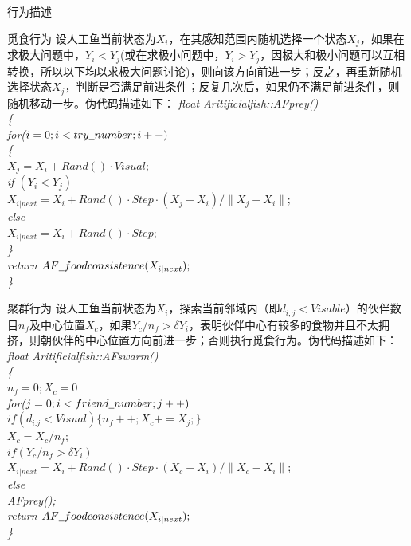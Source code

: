 \documentclass[UTF8]{ctexart}
\begin{document}
\begin{section}
\begin{subsection}{行为描述}

\begin{subsubsection}{觅食行为}
设人工鱼当前状态为$X_i$，在其感知范围内随机选择一个状态$X_j$，如果在求极大问题中，$Y_i<Y_j$(或在求极小问题中，$Y_i>Y_j$，因极大和极小问题可以互相转换，所以以下均以求极大问题讨论)，则向该方向前进一步；反之，再重新随机选择状态$X_j$，判断是否满足前进条件；反复几次后，如果仍不满足前进条件，则随机移动一步。伪代码描述如下：
	\flushleft\scriptsize{\emph{float Aritificial\underline{\hspace{0.5em}}fish::AF\underline{\hspace{0.5em}}prey()\\{\{}\\{\qquad for($i=0;i<try\underline{\hspace{0.5em}}number;i++)$}\\{\qquad\{}\\{\qquad\qquad$X_j=X_i+Rand()·Visual;$}\\{\qquad\qquad if $(Y_i<Y_j)$}\\{\qquad\qquad\qquad $X_{i|next}=X_i+Rand()·Step·(X_j-X_i)/\lVert X_j-X_i\rVert;$}\\{\qquad\qquad else}\\{\qquad\qquad\qquad $X_{i|next}=X_i+Rand()·Step;$}\\{\qquad\}}\\{ return $AF\underline{\hspace{0.5em}}foodconsistence(X_{i|next});$} \\{\}} }}
\end{subsubsection}

\begin{subsubsection}{聚群行为}
设人工鱼当前状态为$X_i$，探索当前邻域内（即$d_{i,j}<Visable$）的伙伴数目$n_f$及中心位置$X_c$，如果$Y_c/n_f>\delta Y_i$，表明伙伴中心有较多的食物并且不太拥挤，则朝伙伴的中心位置方向前进一步；否则执行觅食行为。伪代码描述如下：
	\flushleft\scriptsize{\emph{float Aritificial\underline{\hspace{0.5em}}fish::AF\underline{\hspace{0.5em}}swarm() \\ {\{} \\ {\qquad $n_f=0;X_c=0$} \\ {\qquad for($j=0;i<friend\underline{\hspace{0.5em}}number;j++)$} \\ {\qquad\qquad $if(d_{i.j}<Visual) \{ n_f++;X_c+=X_j;\}$} \\ {\qquad $X_c=X_c/n_f;$}\\{\qquad $if (Y_c/n_f>\delta Y_i)$}\\{\qquad\qquad $X_{i|next}=X_i+Rand()·Step·(X_c-X_i)/\lVert X_c-X_i\rVert;$}\\{\qquad else}\\{\qquad\qquad AF\underline{\hspace{0.5em}}prey();}\\{ return $AF\underline{\hspace{0.5em}}foodconsistence(X_{i|next});$} \\{\}} }}
\end{subsubsection}


\end{subsection}
\end{section}
\end{document}
